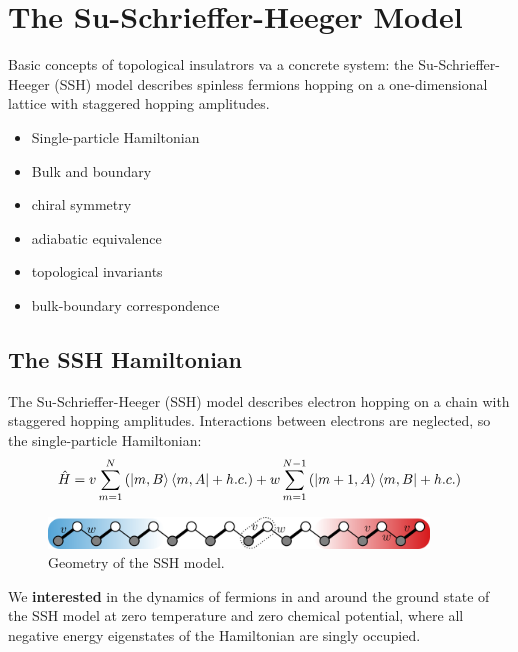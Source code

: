 \chapter{The Su-Schrieffer-Heeger Model}
Basic concepts of topological insulatrors va a concrete system: the Su-Schrieffer-Heeger (SSH) model describes spinless fermions hopping on a one-dimensional lattice with staggered hopping amplitudes.
\begin{itemize}
    \item Single-particle Hamiltonian
    \item Bulk and boundary
    \item chiral symmetry
    \item adiabatic equivalence
    \item topological invariants
    \item bulk-boundary correspondence
\end{itemize}

\section{The SSH Hamiltonian}\label{sec:1.1}
The Su-Schrieffer-Heeger (SSH) model describes electron hopping on a chain with staggered hopping amplitudes.
Interactions between electrons are neglected, so the single-particle Hamiltonian:
\begin{equation}
    \hat{H} = v \sum_{m=1}^N \left( \ket{m,B}\bra{m,A} + h.c. \right) + w \sum_{m=1}^{N-1} \left( \ket{m+1,A}\bra{m,B} + h.c. \right)
    \label{eq:1.1}
\end{equation}
\begin{figure}
    \includegraphics[width=0.9\textwidth]{./fig/ssh_chain_bulkedge.png}
    \caption{Geometry of the SSH model.}
    \label{fig:1.1}
\end{figure}
We \textbf{interested} in the dynamics of fermions in and around the ground state of the SSH model at zero temperature and zero chemical potential, where all negative energy eigenstates of the Hamiltonian are singly occupied.

